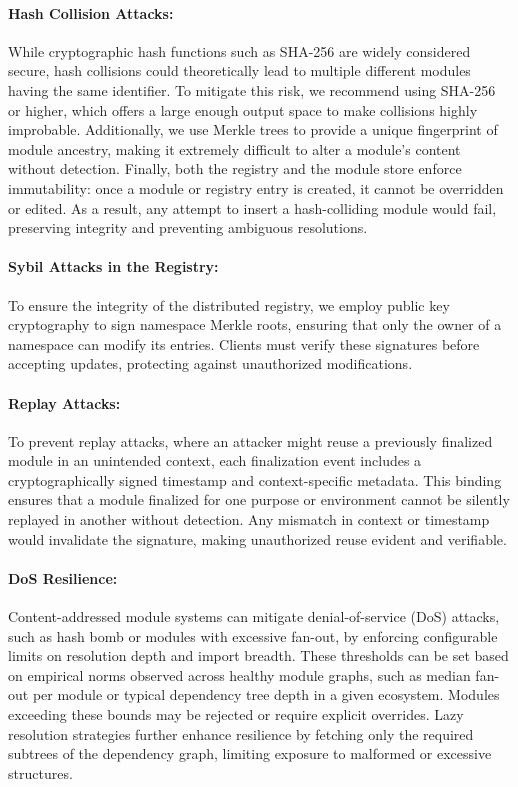 \documentclass[sigplan,screen]{acmart}
\begin{document}
\paragraph{Hash Collision Attacks:} While cryptographic hash functions such as SHA-256 are widely considered secure, hash collisions could theoretically lead to multiple different modules having the same identifier. To mitigate this risk, we recommend using SHA-256 or higher, which offers a large enough output space to make collisions highly improbable. Additionally, we use Merkle trees to provide a unique fingerprint of module ancestry, making it extremely difficult to alter a module's content without detection. Finally, both the registry and the module store enforce immutability: once a module or registry entry is created, it cannot be overridden or edited. As a result, any attempt to insert a hash-colliding module would fail, preserving integrity and preventing ambiguous resolutions.


\paragraph{Sybil Attacks in the Registry:} To ensure the integrity of the distributed registry, we employ public key cryptography to sign namespace Merkle roots, ensuring that only the owner of a namespace can modify its entries. Clients must verify these signatures before accepting updates, protecting against unauthorized modifications.

\paragraph{Replay Attacks:} To prevent replay attacks, where an attacker might reuse a previously finalized module in an unintended context, each finalization event includes a cryptographically signed timestamp and context-specific metadata. This binding ensures that a module finalized for one purpose or environment cannot be silently replayed in another without detection. Any mismatch in context or timestamp would invalidate the signature, making unauthorized reuse evident and verifiable.

\paragraph{DoS Resilience:} Content-addressed module systems can mitigate denial-of-service (DoS) attacks, such as hash bomb or modules with excessive fan-out, by enforcing configurable limits on resolution depth and import breadth. These thresholds can be set based on empirical norms observed across healthy module graphs, such as median fan-out per module or typical dependency tree depth in a given ecosystem. Modules exceeding these bounds may be rejected or require explicit overrides. Lazy resolution strategies further enhance resilience by fetching only the required subtrees of the dependency graph, limiting exposure to malformed or excessive structures.
\end{document}
